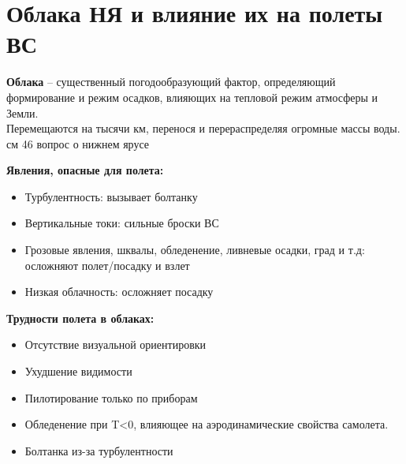 
\section{Облака НЯ и влияние их на полеты ВС}
\textbf{Облака} – существенный погодообразующий фактор, определяющий формирование и режим осадков, влияющих на тепловой режим атмосферы и Земли.\\
Перемещаются на тысячи км, перенося и перераспределяя огромные массы воды.\\
см 46 вопрос о нижнем ярусе\\

\par \textbf{Явления, опасные для полета:} 
\begin{itemize}
	\item Турбулентность: вызывает болтанку
	\item Вертикальные токи: сильные броски ВС
	\item Грозовые явления, шквалы, обледенение, ливневые осадки, град и т.д: осложняют полет/посадку и взлет
	\item Низкая облачность: осложняет посадку
\end{itemize}

\par \textbf{Трудности полета в облаках:}
\begin{itemize}
	\item Отсутствие визуальной ориентировки
	\item Ухудшение видимости
	\item Пилотирование только по приборам
	\item Обледенение при T<0, влияющее на аэродинамические свойства самолета.
	\item Болтанка из-за турбулентности
\end{itemize}